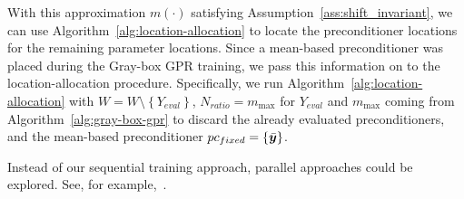 With this approximation $m(\cdot)$ satisfying Assumption~\ref{ass:shift_invariant}, we can use Algorithm~\ref{alg:location-allocation} to locate the preconditioner locations for the remaining parameter locations.
Since a mean-based preconditioner was placed during the Gray-box GPR training, we pass this information on to the location-allocation procedure.
Specifically, we run Algorithm~\ref{alg:location-allocation} with $W=W\setminus\left\{ Y_{eval} \right\}$, $N_{ratio}=m_{\max}$ for $Y_{eval}$ and $m_{\max}$ coming from Algorithm~\ref{alg:gray-box-gpr} to discard the already evaluated preconditioners, and the mean-based preconditioner $pc_{fixed}=\{\bar{{\bm{y}}}\}$.

\begin{remark}
    Instead of our sequential training approach, parallel approaches could be explored.
    See, for example,~\cite{ginsbourger2010,snoek2012}.
\end{remark}